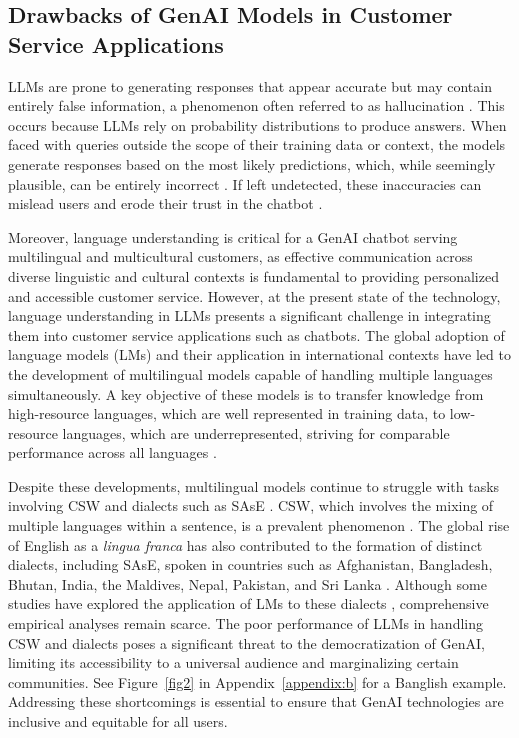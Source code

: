 \documentclass[sigconf]{acmart}
\begin{document}
\subsection{Drawbacks of GenAI Models in Customer Service Applications}

LLMs are prone to generating responses that appear accurate but may contain entirely false information, a phenomenon often referred to as hallucination \cite{ferraro2024paradoxes}. This occurs because LLMs rely on probability distributions to produce answers. When faced with queries outside the scope of their training data or context, the models generate responses based on the most likely predictions, which, while seemingly plausible, can be entirely incorrect \cite{leiser2024hill}. If left undetected, these inaccuracies can mislead users and erode their trust in the chatbot \cite{leiser2024hill}.

Moreover, language understanding is critical for a GenAI chatbot serving multilingual and multicultural customers, as effective communication across diverse linguistic and cultural contexts is fundamental to providing personalized and accessible customer service. However, at the present state of the technology, language understanding in LLMs presents a significant challenge in integrating them into customer service applications such as chatbots. The global adoption of language models (LMs) and their application in international contexts have led to the development of multilingual models capable of handling multiple languages simultaneously. A key objective of these models is to transfer knowledge from high-resource languages, which are well represented in training data, to low-resource languages, which are underrepresented, striving for comparable performance across all languages \cite{doddapaneni2021primer,winata2021language}.

Despite these developments, multilingual models continue to struggle with tasks involving CSW and dialects such as SAsE \cite{winata2021multilingual,zhang2023multilingual,holt2024perceptions}. CSW, which involves the mixing of multiple languages within a sentence, is a prevalent phenomenon \cite{mitra2023mixed}. The global rise of English as a \textit{lingua franca} has also contributed to the formation of distinct dialects, including SAsE, spoken in countries such as Afghanistan, Bangladesh, Bhutan, India, the Maldives, Nepal, Pakistan, and Sri Lanka \cite{zeng2024english, gargesh2019south}. Although some studies have explored the application of LMs to these dialects \cite{holt2024perceptions}, comprehensive empirical analyses remain scarce. The poor performance of LLMs in handling CSW and dialects poses a significant threat to the democratization of GenAI, limiting its accessibility to a universal audience and marginalizing certain communities. See Figure~\ref{fig2} in Appendix~\ref{appendix:b} for a Banglish example. Addressing these shortcomings is essential to ensure that GenAI technologies are inclusive and equitable for all users.
\end{document}
